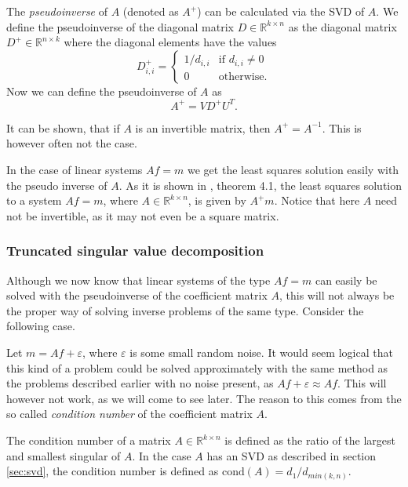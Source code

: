 \documentclass[12pt,a4]{article}
\newcommand{\R}{{\mathbb R}}
\newcommand{\eps}{\varepsilon}
\newcommand{\cond}{\ensuremath{\text{cond}}}
\begin{document}
The \emph{pseudoinverse} of $A$ (denoted as $A^+$) can be calculated via the SVD of $A$. We define the pseudoinverse of the diagonal matrix $D \in \R^{k \times n}$ as the diagonal matrix $D^+ \in \R^{n \times k}$ where the diagonal elements have the values
\begin{equation}
D^+_{i,i} =
\begin{cases}
    1 / d_{i,i} & \text{if }d_{i,i} \neq 0 \\
    0           & \text{otherwise}.
\end{cases}
\end{equation}
Now we can define the pseudoinverse of $A$ as 
\begin{equation}\label{pseudo}
A^+ = V D^+ U^T .
\end{equation}

It can be shown, that if $A$ is an invertible matrix, then $A^+ = A^{-1}$. This is however often not the case.

In the case of linear systems $Af = m$ we get the least squares solution easily with the pseudo inverse of $A$. As it is shown in \cite{samu}, theorem 4.1, the least squares solution to a system $Af = m$, where $A \in \R^{k \times n}$, is given by $A^+ m$. Notice that here $A$ need not be invertible, as it may not even be a square matrix.

\subsubsection{Truncated singular value decomposition}

Although we now know that linear systems of the type $Af = m$ can easily be solved with the pseudoinverse of the coefficient matrix $A$, this will not always be the proper way of solving inverse problems of the same type. Consider the following case.

Let $m = A f + \eps$, where $\eps$ is some small random noise. It would seem logical that this kind of a problem could be solved approximately with the same method as the problems described earlier with no noise present, as $Af + \eps \approx Af$. This will however not work, as we will come to see later. The reason to this comes from the so called \emph{condition number} of the coefficient matrix $A$.

The condition number of a matrix $A \in \R^{k \times n}$ is defined as the ratio of the largest and smallest singular of $A$. In the case $A$ has an SVD as described in section \ref{sec:svd}, the condition number is defined as $\cond(A) = d_1 / d_{min(k,n)}$.
\end{document}
